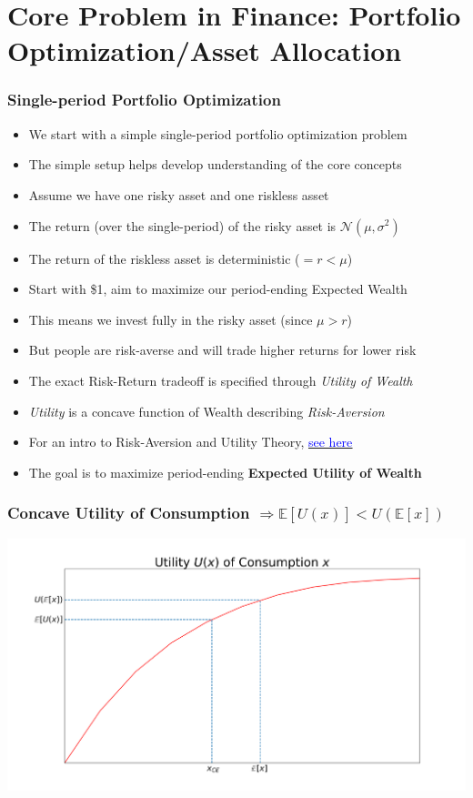 \documentclass[handout]{beamer}
\begin{document}
\section{Core Problem in Finance: Portfolio Optimization/Asset Allocation}

\begin{frame}
\frametitle{Single-period Portfolio Optimization}
\pause
\begin{itemize}[<+->]
\item We start with a simple single-period portfolio optimization problem
\item The simple setup helps develop understanding of the core concepts
\item Assume we have one risky asset and one riskless asset
\item The return (over the single-period) of the risky asset is $\mathcal{N}(\mu, \sigma^2)$
\item The return of the riskless asset is deterministic ($=r < \mu$)
\item Start with \$1, aim to maximize our period-ending Expected Wealth
\item This means we invest fully in the risky asset (since $\mu > r$)
\item But people are risk-averse and will trade higher returns for lower risk
\item The exact Risk-Return tradeoff is specified through {\em Utility of Wealth}
\item {\em Utility} is a concave function of Wealth describing {\em Risk-Aversion}
\item For an intro to Risk-Aversion and Utility Theory, \href{https://github.com/coverdrive/technical-documents/blob/master/finance/cme241/UtilityTheoryForRisk.pdf}{\underline{\textcolor{blue}{see here}}}
\item The goal is to maximize period-ending {\bf Expected Utility of Wealth}
\end{itemize}
\end{frame}

\begin{frame}
\frametitle{Concave Utility of Consumption $\Rightarrow \mathbb{E}[U(x)] < U(\mathbb{E}[x])$}
\includegraphics[scale=0.32]{ce.png}
\end{frame}
\end{document}
